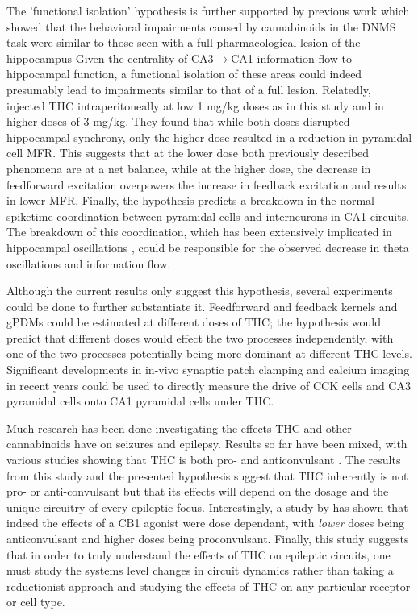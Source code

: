 \documentclass[11pt,a4paper,final]{article}
\begin{document}
The 'functional isolation' hypothesis is further supported by previous work which showed that the behavioral impairments caused by cannabinoids in the DNMS task were similar to those seen with a full pharmacological lesion of the hippocampus \citep{hampson98}
Given the centrality of CA3$\to$CA1 information flow to hippocampal function, a functional isolation of these areas could indeed presumably lead to impairments similar to that of a full lesion.
Relatedly, \citet{goon10} injected THC intraperitoneally at low 1 mg/kg doses as in this study and in higher doses of 3 mg/kg.
They found that while both doses disrupted hippocampal synchrony, only the higher dose resulted in a reduction in pyramidal cell MFR.
This suggests that at the lower dose both previously described phenomena are at a net balance, while at the higher dose, the decrease in feedforward excitation overpowers the increase in feedback excitation and results in lower MFR.
Finally, the hypothesis predicts a breakdown in the normal spiketime coordination between pyramidal cells and interneurons in CA1 circuits.
The breakdown of this coordination, which has been extensively implicated in hippocampal oscillations \citep{traub03,kopell05}, could be responsible for the observed decrease in theta oscillations and information flow.

Although the current results only suggest this hypothesis, several experiments could be done to further substantiate it.
Feedforward and feedback kernels and gPDMs could be estimated at different doses of THC; the hypothesis would predict that different doses would effect the two processes independently, with one of the two processes potentially being more dominant at different THC levels.
Significant developments in in-vivo synaptic patch clamping \citep{tao15} and calcium imaging in recent years could be used to directly measure the drive of CCK cells and CA3 pyramidal cells onto CA1 pyramidal cells under THC.

Much research has been done investigating the effects THC and other cannabinoids have on seizures and epilepsy.
Results so far have been mixed, with various studies showing that THC is both pro- and anticonvulsant \citep{wallace01,blair06,deshpande07,rudenko12,katona15,hill13,katona15}.
The results from this study and the presented hypothesis suggest that THC inherently is not pro- or anti-convulsant but that its effects will depend on the dosage and the unique circuitry of every epileptic focus.
Interestingly, a study by \citet{rudenko12} has shown that indeed the effects of a CB1 agonist were dose dependant, with \textit{lower} doses being anticonvulsant and higher doses being proconvulsant.
Finally, this study suggests that in order to truly understand the effects of THC on epileptic circuits, one must study the systems level changes in circuit dynamics rather than taking a reductionist approach and studying the effects of THC on any particular receptor or cell type.
\end{document}
